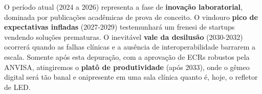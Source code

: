 O período atual (2024 a 2026) representa a fase de \textbf{inovação laboratorial}, dominada por publicações acadêmicas de prova de conceito. O vindouro \textbf{pico de expectativas infladas} (2027-2029) testemunhará um frenesi de startups vendendo soluções prematuras. O inevitável \textbf{vale da desilusão} (2030-2032) ocorrerá quando as falhas clínicas e a ausência de interoperabilidade barrarem a escala. Somente após esta depuração, com a aprovação de ECRs robustos pela ANVISA, atingiremos o \textbf{platô de produtividade} (após 2033), onde o gêmeo digital será tão banal e onipresente em uma sala clínica quanto é, hoje, o refletor de LED.
